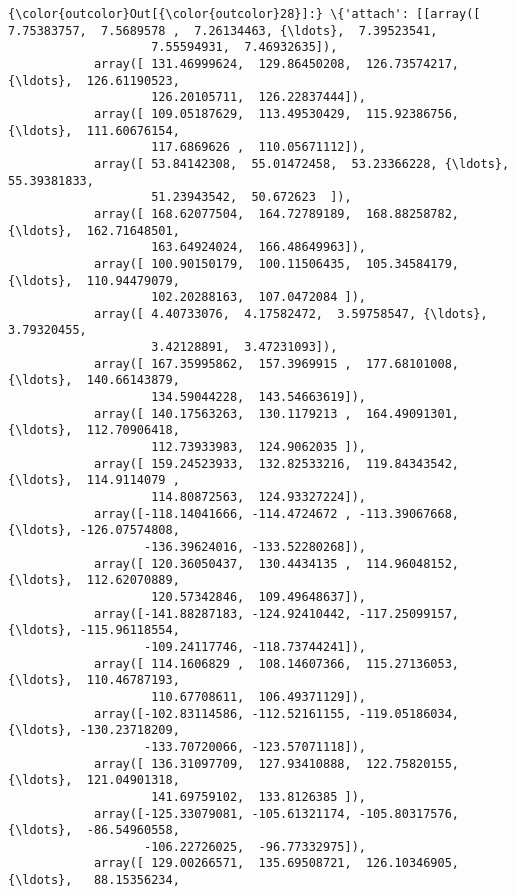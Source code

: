 \documentclass[11pt]{article}
\begin{document}
\begin{Verbatim}[commandchars=\\\{\}]
{\color{outcolor}Out[{\color{outcolor}28}]:} \{'attach': [[array([ 7.75383757,  7.5689578 ,  7.26134463, {\ldots},  7.39523541,
                    7.55594931,  7.46932635]),
            array([ 131.46999624,  129.86450208,  126.73574217, {\ldots},  126.61190523,
                    126.20105711,  126.22837444]),
            array([ 109.05187629,  113.49530429,  115.92386756, {\ldots},  111.60676154,
                    117.6869626 ,  110.05671112]),
            array([ 53.84142308,  55.01472458,  53.23366228, {\ldots},  55.39381833,
                    51.23943542,  50.672623  ]),
            array([ 168.62077504,  164.72789189,  168.88258782, {\ldots},  162.71648501,
                    163.64924024,  166.48649963]),
            array([ 100.90150179,  100.11506435,  105.34584179, {\ldots},  110.94479079,
                    102.20288163,  107.0472084 ]),
            array([ 4.40733076,  4.17582472,  3.59758547, {\ldots},  3.79320455,
                    3.42128891,  3.47231093]),
            array([ 167.35995862,  157.3969915 ,  177.68101008, {\ldots},  140.66143879,
                    134.59044228,  143.54663619]),
            array([ 140.17563263,  130.1179213 ,  164.49091301, {\ldots},  112.70906418,
                    112.73933983,  124.9062035 ]),
            array([ 159.24523933,  132.82533216,  119.84343542, {\ldots},  114.9114079 ,
                    114.80872563,  124.93327224]),
            array([-118.14041666, -114.4724672 , -113.39067668, {\ldots}, -126.07574808,
                   -136.39624016, -133.52280268]),
            array([ 120.36050437,  130.4434135 ,  114.96048152, {\ldots},  112.62070889,
                    120.57342846,  109.49648637]),
            array([-141.88287183, -124.92410442, -117.25099157, {\ldots}, -115.96118554,
                   -109.24117746, -118.73744241]),
            array([ 114.1606829 ,  108.14607366,  115.27136053, {\ldots},  110.46787193,
                    110.67708611,  106.49371129]),
            array([-102.83114586, -112.52161155, -119.05186034, {\ldots}, -130.23718209,
                   -133.70720066, -123.57071118]),
            array([ 136.31097709,  127.93410888,  122.75820155, {\ldots},  121.04901318,
                    141.69759102,  133.8126385 ]),
            array([-125.33079081, -105.61321174, -105.80317576, {\ldots},  -86.54960558,
                   -106.22726025,  -96.77332975]),
            array([ 129.00266571,  135.69508721,  126.10346905, {\ldots},   88.15356234,

\end{Verbatim}
\end{document}
